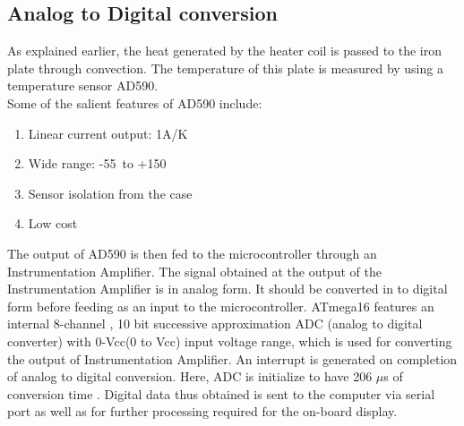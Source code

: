 \documentclass[12pt]{report}
\begin{document}
\subsection{Analog to Digital conversion}

As explained earlier, the heat generated by the heater coil is passed to the iron plate through convection. The temperature of this plate is measured by using a temperature sensor AD590. \\ Some of the salient features of AD590 include:
\begin{enumerate}
\item Linear current output: 1\textmu A/K
\item Wide range: -55\textcelsius \, to +150\textcelsius
\item Sensor isolation from the case
\item Low cost
\end{enumerate}
The output of AD590 is then fed to the microcontroller through an Instrumentation Amplifier. The signal obtained at the output of the Instrumentation Amplifier is in analog form. It should be converted in to digital form before feeding as an input to the microcontroller. ATmega16 features an internal 8-channel , 10 bit successive approximation ADC (analog to digital converter) with 0-Vcc(0 to Vcc) input voltage range, which is used for converting the output of Instrumentation Amplifier. An interrupt is generated on completion of analog to digital conversion. Here, ADC is initialize to have 206 $\mu$s of conversion time . Digital data thus obtained is sent to the computer via serial port as well as for further processing required for the on-board display.
\end{document}
